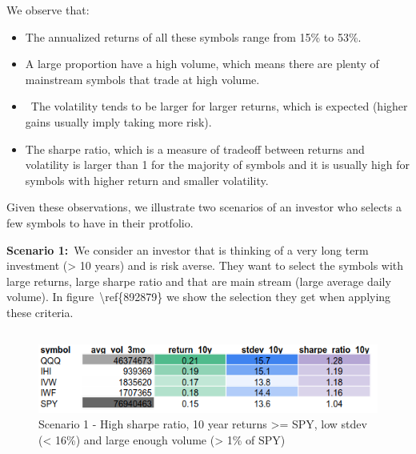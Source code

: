 \documentclass[10pt]{article}
\providecommand{\tightlist}{\setlength{\itemsep}{0pt}\setlength{\parskip}{0pt}}%
\begin{document}
We observe that:

\begin{itemize}
\tightlist
\item
  The annualized returns of all these symbols range from 15\% to 53\%.
\item
  A large proportion have a high volume, which means there are plenty of
  mainstream symbols that trade at high volume.
\item
  ~The volatility tends to be larger for larger returns, which is
  expected (higher gains usually imply taking more risk).
\item
  The sharpe ratio, which is a measure of tradeoff between returns and
  volatility is larger than 1 for the majority of symbols and it is
  usually high for symbols with higher return and smaller volatility.~
\end{itemize}

Given these observations, we illustrate two scenarios of an investor who
selects a few symbols to have in their protfolio.

\textbf{Scenario 1:}~We consider an investor that is thinking of a very
long term investment (\textgreater{} 10 years) and is risk averse. They
want to select the symbols with large returns, large sharpe ratio and
that are main stream (large average daily volume). In
figure~{\textbackslash ref\{892879\}} we show the selection they get
when applying these criteria.~

\hypertarget{section}{%
\subsection{}\label{section}}
\begin{figure}[H]
\begin{center}
\includegraphics[width=0.70\columnwidth]{figures/screenshot1/screenshot1}
\caption{{Scenario 1 - High sharpe ratio, 10 year returns \textgreater= SPY, low
stdev (\textless{} 16\%) and large enough volume (\textgreater{} 1\% of
SPY)
{\label{892879}}%
}}
\end{center}
\end{figure}
\end{document}

